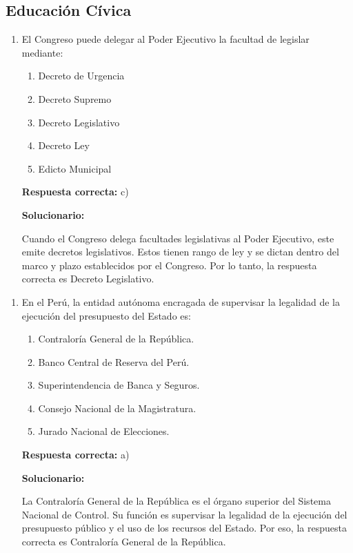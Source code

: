 \subsection*{Educación Cívica}


\begin{enumerate}[resume]
	
	\item El Congreso puede delegar al Poder Ejecutivo la facultad de legislar mediante:
	
	\begin{enumerate}[label=\alph*)]
		\item Decreto de Urgencia
		\item Decreto Supremo
		\item Decreto Legislativo
		\item Decreto Ley
		\item Edicto Municipal
	\end{enumerate}
	
	\textbf{Respuesta correcta:} c)
	
	\vspace{2mm}
	\textbf{Solucionario:}
	
	Cuando el Congreso delega facultades legislativas al Poder Ejecutivo, este emite decretos legislativos. Estos tienen rango de ley y se dictan dentro del marco y plazo establecidos por el Congreso. Por lo tanto, la respuesta correcta es Decreto Legislativo.
	
\end{enumerate}

\begin{enumerate}[resume]
	
	\item En el Perú, la entidad autónoma encragada de supervisar la legalidad de la ejecución del presupuesto del Estado es:
	
	\begin{enumerate}[label=\alph*)]
		\item Contraloría General de la República.
		\item Banco Central de Reserva del Perú.
		\item Superintendencia de Banca y Seguros.
		\item Consejo Nacional de la Magistratura.
		\item Jurado Nacional de Elecciones.
	\end{enumerate}
	
	\textbf{Respuesta correcta:} a)
	
	\vspace{2mm}
	\textbf{Solucionario:}
	
	La Contraloría General de la República es el órgano superior del Sistema Nacional de Control. Su función es supervisar la legalidad de la ejecución del presupuesto público y el uso de los recursos del Estado. Por eso, la respuesta correcta es Contraloría General de la República.
	
\end{enumerate}


